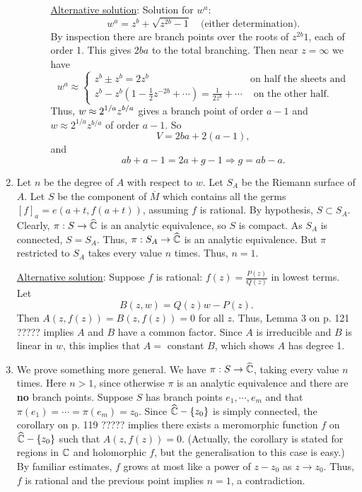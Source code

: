 \documentclass[a4paper,11pt]{article}
\begin{document}
\begin{enumerate}
\begin{itemize}
\begin{itemize}
      \underline{Alternative solution}: Solution for $w^a$:
      $$
      w^a = z^b + \sqrt{z^{2b} - 1}\quad\text{(either determination)}.
      $$
      By inspection there are branch points over the roots of
      $z^{2b}  1$, each of order 1.  This gives $2ba$ to the total
      branching.  Then near $z = \infty$ we have 
      $$
      w^a \approx
      \begin{cases}
        z^b \pm z^b = 2z^b &\text{on half the sheets and}\\
        z^b - z^b(1 - \frac{1}{2}z^{-2b} + \cdots) 
        = \frac{1}{2z^b} + \cdots &\text{ on the other half}.
      \end{cases}
      $$
      Thus, $\displaystyle w \approx 2^{1/a} z^{b/a}$ gives a branch point of
      order $a-1$ and $w \approx 2^{1/a} z^{b/a}$ of order $a-1$.
      So
      $$
      V = 2ba + 2(a-1),
      $$
      and
      $$
      ab + a-1 = 2a + g-1 \Rightarrow g = ab-a.
      $$
    \end{itemize}
  \end{itemize}

\item Let $n$ be the degree of $A$ with respect to $w$. Let $S_A$ be
  the Riemann surface of $A$.  Let $S$ be the component of
  $\overline{M}$ which contains all the germs $[f]_a = e(a+t,
  f(a+t))$, assuming $f$ is rational.  By hypothesis, $S \subset
  S_A$.  Clearly, $\pi : S \to \widehat{{\mathbb C}}$ is an analytic
  equivalence, so $S$ is compact.  As $S_A$ is connected, $S = S_A$.
  Thus, $\pi : S_A \to \widehat{{\mathbb C}}$ is an analytic equivalence.
  But $\pi$ restricted to $S_A$ takes every value $n$ times.  Thus, $n
  = 1$.

  \underline{Alternative solution}:
  Suppose $f$ is rational: $f(z) = \frac{P(z)}{Q(z)}$ in lowest
  terms.  Let
  $$
  B(z, w) = Q(z) w - P(z).
  $$
  Then $A(z, f(z)) = B(z, f(z)) = 0$ for all $z$.  Thus, Lemma 3 on
  p. 121 ????? implies $A$ and $B$ have a common factor.  Since $A$ is
  irreducible and $B$ is linear in $w$, this implies that $A = $
  constant $B$, which shows $A$ has degree 1.

\item We prove something more general.  We have $\pi : S \to
  \widehat{{\mathbb C}}$, 
  taking every value $n$ times.  Here $n > 1$, since otherwise $\pi$
  is an analytic equivalence and there are \textbf{no} branch points.
  Suppose $S$ has branch points $e_1, \cdots, e_m$ and that $\pi(e_1)
  = \cdots = \pi(e_m) = z_0$.  Since $\widehat{{\mathbb C}} - \{z_0\}$ is
  simply connected, the corollary on p. 119 ????? implies there exists
  a meromorphic function $f$ on $\widehat{{\mathbb C}} - \{z_0\}$ such that
  $A(z, f(z)) = 0$.  (Actually, the corollary is stated for regions in
  ${\mathbb C}$ and holomorphic $f$, but the generalisation to this case is
  easy.)  By familiar estimates, $f$ grows at most like a power of
  $z-z_0$ as $z \to z_0$.  Thus, $f$ is rational and the previous
  point implies $n = 1$, a contradiction.


\end{enumerate}
\end{document}
